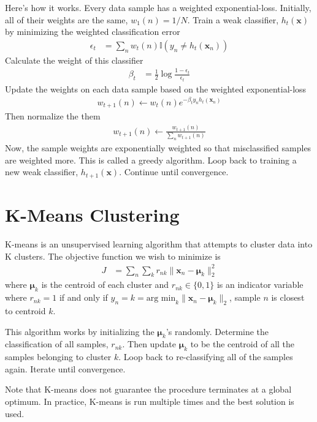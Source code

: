 \documentclass[11pt]{article}
\newcommand{\vct}[1]{\boldsymbol{#1}} %
\newcommand{\ProbOpr}[1]{\mathbb{#1}}
\begin{document}
Here's how it works. Every data sample has a weighted exponential-loss. Initially, all of their weights are the same, $w_1(n) = 1/N$. Train a weak classifier, $h_t(\vct{x})$ by minimizing the weighted classification error
\begin{align*}
\epsilon_t &= \sum_n w_t(n)\ProbOpr{I}(y_n \ne h_t(\vct{x}_n))
\end{align*}
Calculate the weight of this classifier
\begin{align*}
\beta_t &= \frac{1}{2}\log \frac{1-\epsilon_t}{\epsilon_t}
\end{align*}
Update the weights on each data sample based on the weighted exponential-loss
\begin{align*}
w_{t+1}(n) \gets w_t(n)e^{-\beta_t y_n h_t(\vct{x}_n)}
\end{align*}
Then normalize the them
\begin{align*}
w_{t+1}(n) \gets \frac{w_{t+1}(n)}{\sum_n w_{t+1}(n)} 
\end{align*}
Now, the sample weights are exponentially weighted so that misclassified samples are weighted more. This is called a greedy algorithm. Loop back to training a new weak classifier, $h_{t+1}(\vct{x})$. Continue until convergence.


\section{K-Means Clustering}
K-means is an unsupervised learning algorithm that attempts to cluster data into K clusters. The objective function we wish to minimize is
\begin{align*}
J &= \sum_n \sum_k r_{nk} \|\vct{x}_n - \vct{\mu}_k \|_2^2
\end{align*}
where $\vct{\mu}_k$ is the centroid of each cluster and $r_{nk} \in \{0,1\}$ is an indicator variable where $r_{nk} = 1$ if and only if $y_n = k = \text{arg min}_k \|\vct{x}_n - \vct{\mu}_k \|_2$, sample $n$ is closest to centroid $k$.

This algorithm works by initializing the $\vct{\mu}_k$'s randomly. Determine the classification of all samples, $r_{nk}$. Then update $\vct{\mu}_k$ to be the centroid of all the samples belonging to cluster $k$. Loop back to re-classifying all of the samples again. Iterate until convergence.

Note that K-means does not guarantee the procedure terminates at a global optimum. In practice, K-means is run multiple times and the best solution is used. 
\end{document}
